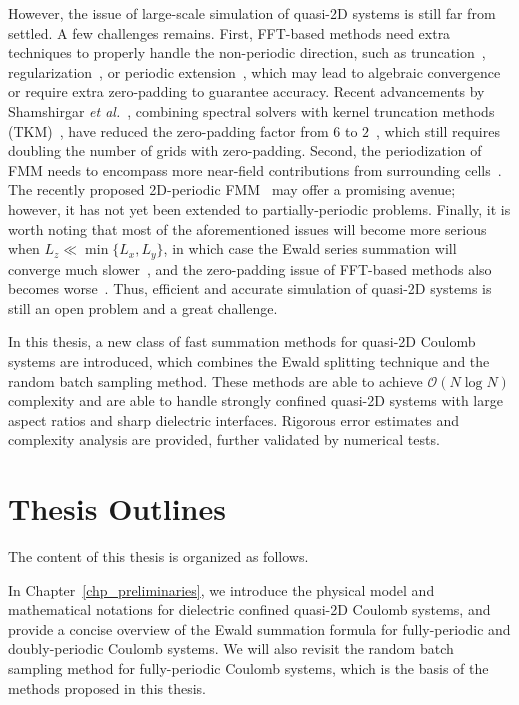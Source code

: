 However, the issue of large-scale simulation of quasi-2D systems is still far from settled.
A few challenges remains. First, FFT-based methods need extra techniques to properly handle the non-periodic direction, such as truncation~\cite{parry1975electrostatic}, regularization~\cite{nestler2015fast}, or periodic extension~\cite{lindbo2012fast}, which may lead to algebraic convergence or require extra zero-padding to guarantee accuracy. 
Recent advancements by Shamshirgar \emph{et al.}~\cite{shamshirgar2021fast}, combining spectral solvers with kernel truncation methods (TKM)~\cite{vico2016fast}, have reduced the zero-padding factor from $6$ to $2$~\cite{lindbo2012fast}, which still requires doubling the number of grids with zero-padding. 
Second, the periodization of FMM needs to encompass more near-field contributions from surrounding cells~\cite{yan2018flexibly,barnett2018unified}. The recently proposed 2D-periodic FMM~\cite{PEI2023111792} may offer a promising avenue; however, it has not yet been extended to partially-periodic problems.
Finally, it is worth noting that most of the aforementioned issues will become more serious when $L_z\ll \min\{L_x, L_y\}$, in which case the Ewald series summation will converge much slower~\cite{arnold2002electrostatics}, and the zero-padding issue of FFT-based methods also becomes worse~\cite{maxian2021fast}.
Thus, efficient and accurate simulation of quasi-2D systems is still an open problem and a great challenge.

In this thesis, a new class of fast summation methods for quasi-2D Coulomb systems are introduced, which combines the Ewald splitting technique and the random batch sampling method.
These methods are able to achieve $\mathcal{O}(N\log N)$ complexity and are able to handle strongly confined quasi-2D systems with large aspect ratios and sharp dielectric interfaces.
Rigorous error estimates and complexity analysis are provided, further validated by numerical tests.

\section{Thesis Outlines}

The content of this thesis is organized as follows.

In Chapter~\ref{chp_preliminaries}, we introduce the physical model and mathematical notations for dielectric confined quasi-2D Coulomb systems, and provide a concise overview of the Ewald summation formula for fully-periodic and doubly-periodic Coulomb systems.
We will also revisit the random batch sampling method for fully-periodic Coulomb systems, which is the basis of the methods proposed in this thesis.

